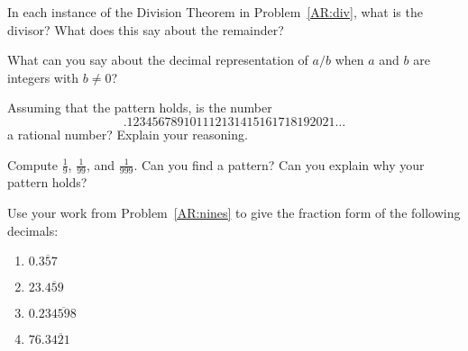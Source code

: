 \begin{prob} 
In each instance of the Division Theorem in Problem~\ref{AR:div}, what
is the divisor? What does this say about the remainder?
\end{prob}

\begin{prob} 
What can you say about the decimal representation of $a/b$ when $a$
and $b$ are integers with $b\ne 0$?
\end{prob}

\begin{prob} 
Assuming that the pattern holds, is the number
\[
.123456789101112131415161718192021\dots
\]
a rational number? Explain your reasoning.
\end{prob}


\begin{prob}\label{AR:nines} 
Compute $\frac{1}{9}$, $\frac{1}{99}$, and $\frac{1}{999}$. Can you
find a pattern? Can you explain why your pattern holds?
\end{prob}


\begin{prob}
Use your work from Problem~\ref{AR:nines} to give the fraction form of
the following decimals:
\begin{enumerate}
\item $0.\overline{357}$
\item $23.\overline{459}$
\item $0.23\overline{4598}$
\item $76.3\overline{421}$
\end{enumerate}
\end{prob}

